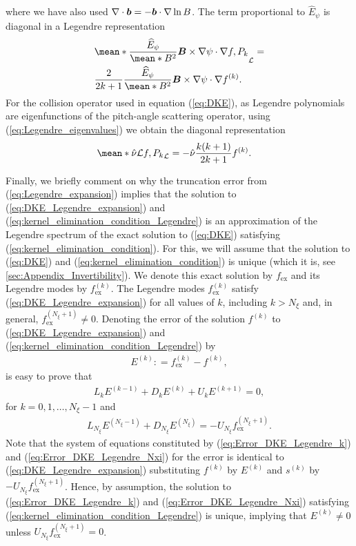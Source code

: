 where we have also used $\nabla\cdot\vb*{b}  = - \vb*{b}\cdot \nabla \ln B$. The term proportional to $\widehat{E}_\psi$ is diagonal in a Legendre representation
%
\begin{align}
	&
	\mean*{\frac{\widehat{E}_\psi}{\mean*{B^2}}
		\vb*{B}\times \nabla\psi \cdot\nabla f , P_k}_\Lorentz
	=
	\\ 
	&
	\frac{2}{2k+1}
	\frac{\widehat{E}_\psi}{\mean*{B^2}}
	\vb*{B}\times \nabla\psi \cdot\nabla f^{(k)}.
	\nonumber
\end{align}
For the collision operator used in equation (\ref{eq:DKE}), as Legendre polynomials are eigenfunctions of the pitch-angle scattering operator, using (\ref{eq:Legendre_eigenvalues}) we obtain the diagonal representation 
%
\begin{align}
	\mean*{\hat{\nu} \Lorentz f , P_k}_\Lorentz
	&
	=
	-\hat{\nu}
	\frac{k(k+1)}{2k+1}	
	f^{(k)}.
\end{align}

Finally, we briefly comment on why the truncation error from (\ref{eq:Legendre_expansion}) implies that the solution to (\ref{eq:DKE_Legendre_expansion}) and (\ref{eq:kernel_elimination_condition_Legendre}) is an approximation of the Legendre spectrum of the exact solution to (\ref{eq:DKE}) satisfying (\ref{eq:kernel_elimination_condition}). For this, we will assume that the solution to (\ref{eq:DKE}) and (\ref{eq:kernel_elimination_condition}) is unique (which it is, see \ref{sec:Appendix_Invertibility}). We denote this exact solution by $f_{\text{ex}}$ and its Legendre modes by $f^{(k)}_{\text{ex}}$. The Legendre modes $f^{(k)}_{\text{ex}}$ satisfy (\ref{eq:DKE_Legendre_expansion}) for all values of $k$, including $k>N_\xi$ and, in general, $f^{(N_\xi+1)}_{\text{ex}}\ne 0$. Denoting the error of the solution $f^{(k)}$ to (\ref{eq:DKE_Legendre_expansion}) and (\ref{eq:kernel_elimination_condition_Legendre}) by
%
\begin{align}
	E^{(k)} : = f^{(k)}_{\text{ex}} - f^{(k)} ,
\end{align}
is easy to prove that
%
\begin{align}
	L_k E^{(k-1)} + D_k E^{(k)} + U_k E^{(k+1)} = 0, 
	\label{eq:Error_DKE_Legendre_k}
\end{align}
for $k =0,1,\ldots, N_\xi-1$ and 
%
\begin{align}
	L_{N_\xi} E^{(N_\xi-1)} + D_{N_\xi} E^{(N_\xi)} = - U_{N_\xi} f^{(N_\xi+1)}_{\text{ex}}.
	\label{eq:Error_DKE_Legendre_Nxi}
\end{align}
Note that the system of equations constituted by (\ref{eq:Error_DKE_Legendre_k}) and (\ref{eq:Error_DKE_Legendre_Nxi}) for the error is identical to (\ref{eq:DKE_Legendre_expansion}) substituting $f^{(k)}$ by $E^{(k)}$ and $s^{(k)}$ by $- U_{N_\xi} f^{(N_\xi+1)}_{\text{ex}}$. Hence, by assumption, the solution to (\ref{eq:Error_DKE_Legendre_k}) and (\ref{eq:Error_DKE_Legendre_Nxi}) satisfying (\ref{eq:kernel_elimination_condition_Legendre}) is unique, implying that $E^{(k)}\ne 0$ unless $ {U}_{N_\xi} f^{(N_\xi+1)}_{\text{ex}} = 0$.